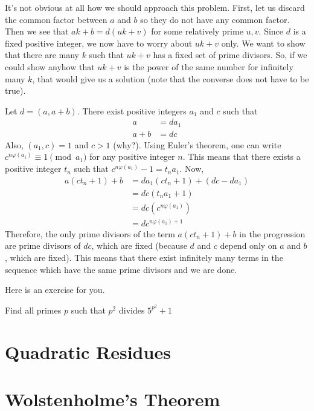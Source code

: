 \documentclass{subfile}
\begin{document}
		\begin{solution}
			It's not obvious at all how we should approach this problem. First, let us discard the common factor between $a$ and $b$ so they do not have any common factor. Then we see that $ak+b=d(uk+v)$ for some relatively prime $u,v$. Since $d$ is a fixed positive integer, we now have to worry about $uk+v$ only. We want to show that there are many $k$ such that $uk+v$ has a fixed set of prime divisors. So, if we could show anyhow that $uk+v$ is the power of the same number for infinitely many $k$, that would give us a solution (note that the converse does not have to be true).

			Let $d=(a, a+b)$. There exist positive integers $a_1$ and $c$ such that
				\begin{align*}
					a
						& =da_1\\
					a+b
						& =dc
				\end{align*}
			Also, $(a_1,c)=1$ and $c >1$ (why?). Using Euler's theorem, one can write $c^{n\varphi(a_1)} \equiv 1 \pmod {a_1}$ for any positive integer $n$. This means that there exists a positive integer $t_n$ such that $c^{n\varphi(a_1)}-1 = t_na_1$. Now,
				\begin{align*}
					a(ct_n+1) + b &= da_1(ct_n+1) + (dc-da_1)\\
								  &= dc(t_na_1 + 1)\\
								  &= dc \left(c^{n\varphi(a_1)}\right)\\
								  &= dc^{n\varphi(a_1)+1}
				\end{align*}
			Therefore, the only prime divisors of the term $a(ct_n+1) + b$ in the progression are prime divisors of $dc$, which are fixed (because $d$ and $c$ depend only on $a$ and $b$, which are fixed). This means that there exist infinitely many terms in the sequence which have the same prime divisors and we are done.
		\end{solution}
	Here is an exercise for you.
		\begin{problem}
			Find all primes $p$ such that $p^2$ divides $5^{p^2}+1$
		\end{problem}


	\section{Quadratic Residues}\label{sec:qr}
		
	\section{Wolstenholme's Theorem}
		
\end{document}
